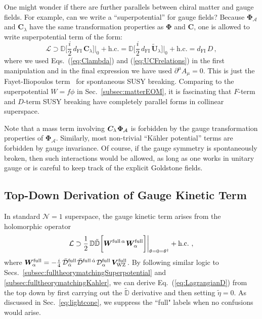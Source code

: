 \documentclass[12pt,document,nofootinbib,superscriptaddress,onecolumn,preprintnumbers,balancelastpage]{article}
\newcommand{\full}{\text{full}}
\newcommand{\s}{\hspace{0.8pt}}
\DeclareRobustCommand{\Sec}[1]{Sec.~\ref{#1}}
\DeclareRobustCommand{\Secs}[2]{Secs.~\ref{#1} and \ref{#2}}
\DeclareRobustCommand{\Eq}[1]{Eq.~(\ref{#1})}
\DeclareRobustCommand{\Eqs}[2]{Eqs.~(\ref{#1}) and (\ref{#2})}
\newcommand{\bPhi}{ \boldsymbol \Phi}
\newcommand{\bC}{ \boldsymbol C}
\newcommand{\bV}{ \boldsymbol V}
\newcommand{\bW}{ \boldsymbol W}
\newcommand{\bPhialc}{ \boldsymbol{\Phi}_\alc}
\newcommand{\bU}{ \tilde{\boldsymbol U}}
\newcommand{\D}{\mathbb{D}}
\newcommand{\alc}{\mathcal{A}}
\begin{document}
\begin{spacing}{1.2}
One might wonder if there are further parallels between chiral matter and gauge fields.
%
For example, can we write a ``superpotential'' for gauge fields?
%
Because $\bPhialc$ and $\bC_\lambda$ have the same transformation properties as $\bPhi$ and $\bC$, one is allowed to write superpotential term of the form:
%
\begin{equation}
\label{eq:FIterm}
\mathcal{L}  \supset \D  \bigg[ \frac{i}{2}\, d_\text{FI} \, \bC_\lambda \bigg] \bigg|_{0} + \text{h.c.} = \D  \bigg[\frac{i}{2}\, d_\text{FI} \, \bU_\lambda \bigg] \bigg|_{0} + \text{h.c.} = d_\text{FI}\, D  \,,
\end{equation}
%
where we used \Eqs{eq:Clambda}{eq:UCFrelations} in the first manipulation and in the final expression we have used $\partial^\mu A_\mu = 0$.
%
This is just the Fayet-Iliopoulos term~\cite{Fayet:1974jb} for spontaneous SUSY breaking.
%
Comparing to the superpotential $W = f \phi$ in \Sec{subsec:matterEOM}, it is fascinating that $F$-term and $D$-term SUSY breaking have completely parallel forms in collinear superspace. 


Note that a mass term involving $\bC_\lambda\s \bPhialc$ is forbidden by the gauge transformation properties of $\bPhialc$.
%
Similarly, most non-trivial ``K\"ahler potential'' terms are forbidden by gauge invariance.
%
Of course, if the gauge symmetry is spontaneously broken, then such interactions would be allowed, as long as one works in unitary gauge or is careful to keep track of the explicit Goldstone fields.



\subsection{Top-Down Derivation of Gauge Kinetic Term}

In standard $\mathcal{N} = 1$ superspace, the gauge kinetic term arises from the holomorphic operator 
%
\begin{align}
\label{eq:LfullTheory}
\mathcal{L}  \supset   \frac{1}{2}\, \D \tilde{\D}  \bigg[ \bW^{\text{full}\,\alpha} \s \bW^\text{full}_\alpha  \bigg] \bigg|_{\theta = 0 = \theta^\dagger} + \text{h.c.}\,\,, 
\end{align}
%
where $\bW_\alpha^\text{full} = -\frac{i}{4}\, \bar{\mathcal{D}}^\text{full}_{\dot{\alpha}}\s \bar{\mathcal{D}}^{\text{full}\,\dot{\alpha}}\s \mathcal{D}^\text{full}_\alpha\, \bV_{\text{WZ}}^{\full}$.
%
By following similar logic to \Secs{subsec:fulltheorymatchingSuperpotential}{subsec:fulltheorymatchingKahler}, we can derive \Eq{eq:LagrangianD} from the top down by first carrying out the $\tilde{\D}$ derivative and then setting $\tilde{\eta} = 0$.
%
As discussed in \Sec{eq:lightcone}, we suppress the ``full" labels when no confusions would arise.



\end{spacing}
\end{document}
